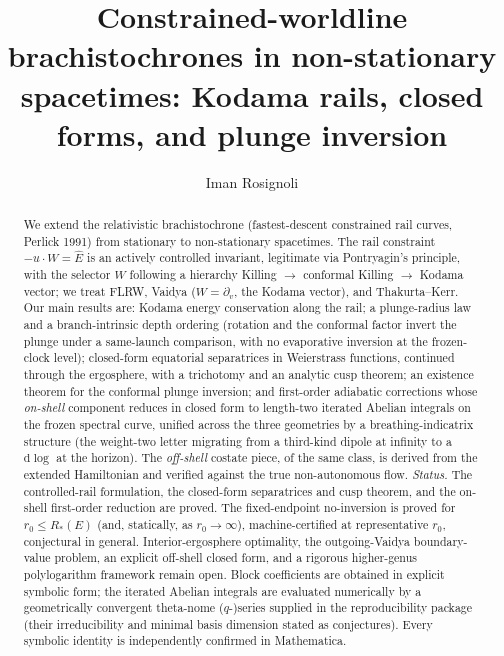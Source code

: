 \documentclass[12pt]{iopart}
\newcommand{\Ehat}{\hat E}
\begin{document}
\title{Constrained-worldline brachistochrones in non-stationary
spacetimes: Kodama rails, closed forms, and plunge inversion}

\author{Iman Rosignoli}
\address{University of Pavia, Pavia, Italy}

\begin{abstract}
We extend the relativistic brachistochrone (fastest-descent constrained rail
curves, Perlick 1991) from stationary to non-stationary spacetimes. The rail
constraint $-u\cdot W=\Ehat$ is an actively controlled invariant, legitimate via
Pontryagin's principle, with the selector $W$ following a hierarchy Killing $\to$
conformal Killing $\to$ Kodama vector; we treat FLRW, Vaidya
($W=\partial_v$, the Kodama vector), and Thakurta--Kerr. Our main results are:
Kodama energy conservation along the rail; a plunge-radius law and a branch-intrinsic
depth ordering (rotation and the conformal factor invert the plunge under a
same-launch comparison, with no evaporative inversion at the frozen-clock level);
closed-form equatorial separatrices in Weierstrass functions, continued through
the ergosphere, with a trichotomy and an analytic cusp theorem; an existence
theorem for the conformal plunge inversion; and first-order adiabatic corrections
whose \emph{on-shell} component reduces in closed form to length-two iterated
Abelian integrals on the frozen spectral curve, unified across the three geometries
by a breathing-indicatrix structure (the weight-two letter migrating from a
third-kind dipole at infinity to a $\mathrm{d}\!\log$ at the horizon). The
\emph{off-shell} costate piece, of the same class, is derived from the extended
Hamiltonian and verified against the true non-autonomous flow.
\emph{Status.} The controlled-rail formulation, the closed-form separatrices and
cusp theorem, and the on-shell first-order reduction are proved. The fixed-endpoint
no-inversion is proved for $r_0\le R_\ast(E)$ (and, statically, as
$r_0\to\infty$), machine-certified at representative $r_0$, conjectural in general.
Interior-ergosphere optimality, the outgoing-Vaidya boundary-value problem, an
explicit off-shell closed form, and a rigorous higher-genus polylogarithm framework
remain open. Block coefficients are obtained in explicit symbolic form; the
iterated Abelian integrals are evaluated numerically by a geometrically convergent
theta-nome ($q$-)series supplied in the reproducibility package (their
irreducibility and minimal basis dimension stated as conjectures). Every symbolic
identity is independently confirmed in Mathematica.
\end{abstract}
\end{document}
